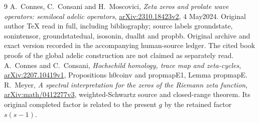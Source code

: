 \documentclass[11pt]{article}
\begin{document}
\begin{thebibliography}{9}
 A.~Connes, C.~Consani and H.~Moscovici,
\emph{Zeta zeros and prolate wave operators: semilocal adelic operators},
\href{https://arxiv.org/abs/2310.18423v2}{arXiv:2310.18423v2},
4 May2024. Original author TeX read in full, including bibliography;
source labels groundstate, sonintensor, groundstatedual, isosonin,
dualht and propbb. Original archive and exact version recorded in
the accompanying human-source ledger. The cited book proofs of
the global adelic construction are not claimed as separately read.
 A.~Connes and C.~Consani,
\emph{Hochschild homology, trace map and zeta-cycles},
\href{https://arxiv.org/abs/2207.10419v1}{arXiv:2207.10419v1},
Propositions h0coinv and propmapE1, Lemma propmapE.
 R.~Meyer,
\emph{A spectral interpretation for the zeros of the Riemann zeta function},
\href{https://arxiv.org/abs/math/0412277v3}{arXiv:math/0412277v3},
weighted-Schwartz source and closed-range theorem. Its original
completed factor is related to the present $g$ by the retained
factor $s(s-1)$.
\end{thebibliography}
\end{document}
